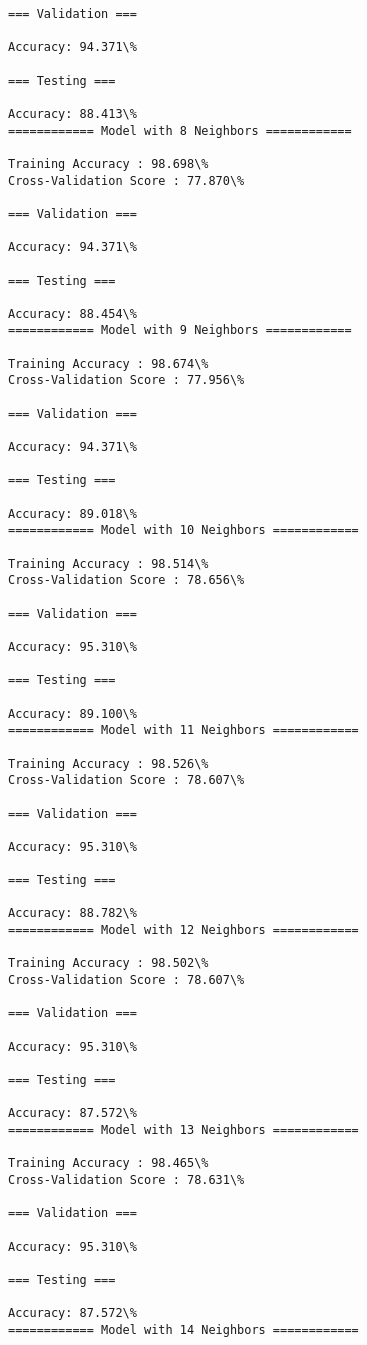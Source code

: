 \documentclass[11pt]{article}
\begin{document}
\begin{Verbatim}[commandchars=\\\{\}]
=== Validation ===

Accuracy: 94.371\%

=== Testing ===

Accuracy: 88.413\%
============ Model with 8 Neighbors ============

Training Accuracy : 98.698\%
Cross-Validation Score : 77.870\%

=== Validation ===

Accuracy: 94.371\%

=== Testing ===

Accuracy: 88.454\%
============ Model with 9 Neighbors ============

Training Accuracy : 98.674\%
Cross-Validation Score : 77.956\%

=== Validation ===

Accuracy: 94.371\%

=== Testing ===

Accuracy: 89.018\%
============ Model with 10 Neighbors ============

Training Accuracy : 98.514\%
Cross-Validation Score : 78.656\%

=== Validation ===

Accuracy: 95.310\%

=== Testing ===

Accuracy: 89.100\%
============ Model with 11 Neighbors ============

Training Accuracy : 98.526\%
Cross-Validation Score : 78.607\%

=== Validation ===

Accuracy: 95.310\%

=== Testing ===

Accuracy: 88.782\%
============ Model with 12 Neighbors ============

Training Accuracy : 98.502\%
Cross-Validation Score : 78.607\%

=== Validation ===

Accuracy: 95.310\%

=== Testing ===

Accuracy: 87.572\%
============ Model with 13 Neighbors ============

Training Accuracy : 98.465\%
Cross-Validation Score : 78.631\%

=== Validation ===

Accuracy: 95.310\%

=== Testing ===

Accuracy: 87.572\%
============ Model with 14 Neighbors ============


\end{Verbatim}
\end{document}
